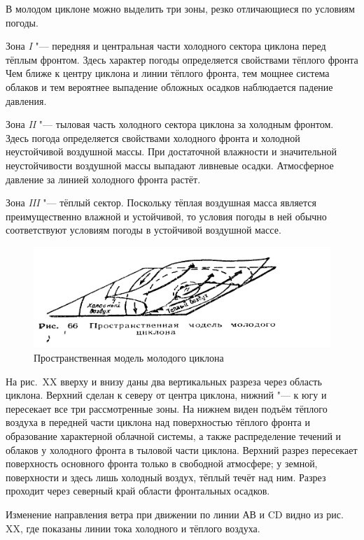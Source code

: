 \documentclass[a4paper, 12pt, twoside, final, book, russian, fittopage, cyremdash, openright]{ncc}
\begin{document}
В молодом циклоне можно выделить три зоны, резко отличающиеся по условиям погоды.

Зона \textit{I} "--- передняя и центральная части холодного сектора
циклона перед тёплым фронтом. Здесь характер погоды определяется
свойствами тёплого фронта Чем ближе к центру циклона и линии тёплого
фронта, тем мощнее система облаков и тем вероятнее выпадение обложных
осадков наблюдается падение давления.

Зона \textit{II} "--- тыловая часть холодного сектора циклона за холодным
фронтом. Здесь погода определяется свойствами холодного фронта и
холодной неустойчивой воздушной массы. При достаточной влажности и
значительной неустойчивости воздушной массы выпадают ливневые
осадки. Атмосферное давление за линией холодного фронта растёт.

Зона \textit{III} "--- тёплый сектор. Поскольку тёплая воздушная масса
является преимущественно влажной и устойчивой, то условия погоды в
ней обычно соответствуют условиям погоды в устойчивой воздушной массе.

\begin{figure}[htb]
   \centering
   \includegraphics[scale=1]{13_cyclon_model.pdf}
   \caption{Пространственная модель молодого циклона}
   \label{fig:cyclon_model}
\end{figure}

На рис.~XX вверху и внизу даны два вертикальных разреза через область
циклона. Верхний сделан к северу от центра циклона, нижний "--- к югу и
пересекает все три рассмотренные зоны. На нижнем виден подъём тёплого
воздуха в передней части циклона над поверхностью тёплого фронта и
образование характерной облачной системы, а также распределение
течений и облаков у холодного фронта в тыловой части циклона. Верхний
разрез пересекает поверхность основного фронта только в свободной
атмосфере; у земной, поверхности и здесь лишь холодный воздух, тёплый
течёт над ним. Разрез проходит через северный край области фронтальных
осадков.

Изменение направления ветра при движении по линии АВ и CD видно из
рис. XX, где показаны линии тока холодного и тёплого воздуха.
\end{document}
